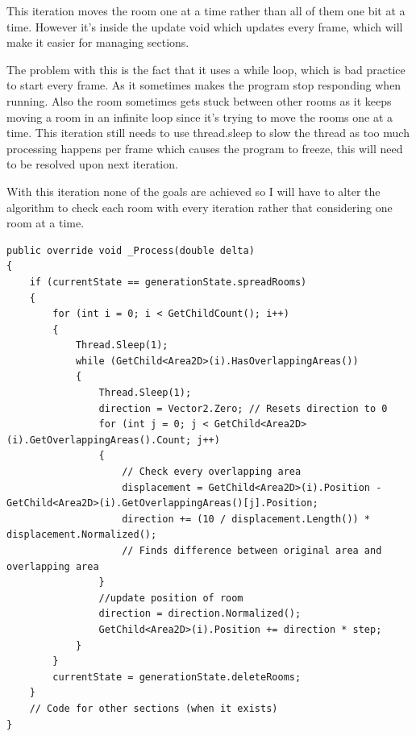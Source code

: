 \documentclass{article}
\newcommand{\parBr}{\vspace{5mm}}%
\begin{document}
This iteration moves the room one at a time rather than all of them one bit at a time. However it's inside the update void which updates every frame, which will make it easier for managing sections.

\parBr

The problem with this is the fact that it uses a while loop, which is bad practice to start every frame. As it sometimes makes the program stop responding when running. Also the room sometimes gets stuck between other rooms as it keeps moving a room in an infinite loop since it's trying to move the rooms one at a time. This iteration still needs to use thread.sleep to slow the thread as too much processing happens per frame which causes the program to freeze, this will need to be resolved upon next iteration.

\parBr

With this iteration none of the goals are achieved so I will have to alter the algorithm to check each room with every iteration rather that considering one room at a time.
\begin{lstlisting}
public override void _Process(double delta)
{
    if (currentState == generationState.spreadRooms)
    {
        for (int i = 0; i < GetChildCount(); i++)
        {
            Thread.Sleep(1);
            while (GetChild<Area2D>(i).HasOverlappingAreas())
            {
                Thread.Sleep(1);
                direction = Vector2.Zero; // Resets direction to 0
                for (int j = 0; j < GetChild<Area2D>(i).GetOverlappingAreas().Count; j++) 
                {
                	// Check every overlapping area
                    displacement = GetChild<Area2D>(i).Position - GetChild<Area2D>(i).GetOverlappingAreas()[j].Position;
                    direction += (10 / displacement.Length()) * displacement.Normalized(); 
                    // Finds difference between original area and overlapping area
                }
                //update position of room
                direction = direction.Normalized();
                GetChild<Area2D>(i).Position += direction * step;
            }
        }
        currentState = generationState.deleteRooms;
    }
    // Code for other sections (when it exists)
}
\end{lstlisting}
\end{document}

